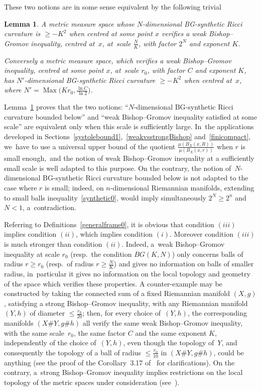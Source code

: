 \documentclass[10pt,a4paper]{amsart}
\numberwithin{equation}{section}
\newtheorem{Lemma}[theor]{Lemma}
\newcommand{\Max}{\operatorname{Max}}
\begin{document}
These two notions are in some sense equivalent by the following trivial

\begin{Lemma}\label{Bishopvssynthetic}
A metric measure space whose $N$-dimensional BG-synthetic Ricci curvature
is $\ge -K^2$ when centred at some point $x$ verifies a weak Bishop--Gromov inequality,
centred at~$x$, at~scale $\frac{N}{K}$, with factor $2^{N}$ and exponent $K$.

Conversely a metric measure space, which verifies a weak Bishop--Gromov inequality, centred at some point $x$, at~scale $r_0$, with factor $C$ and
exponent $K$, has $N'$-dimensional BG-synthetic Ricci curvature $\ge -K^2$ when centred at~$x$, where
$N' = \Max \big( K r_0, \frac{\ln C}{\ln 2} \big)$.
\end{Lemma}

Lemma~\ref{Bishopvssynthetic} proves that the two notions: ``$N$-dimensional BG-synthetic Ricci curvature boun\-ded below'' and
``weak Bishop--Gromov inequality satisfied at some scale'' are equivalent only when this scale is sufficiently large. In~the applications
developed in Sections~\ref{systolebound1},~\ref{weakvsstrongBishop} and~\ref{finicompact}, we~have to use a universal upper bound of the quotient
$\frac{\mu ( B_X(x, R))}{\mu ( B_X(x,r))}$ when $r$ is small enough,~and the notion of weak Bishop--Gromov inequality at a
sufficiently small scale is well adapted to this purpose. On the contrary, the notion of~$N$-dimensional BG-synthetic Ricci curvature bounded below
is not adapted to the case where $r$ is small; indeed, on $n$-dimensional
Riemannian manifolds, extending to small balls inequality~\eqref{synthetic0},
would imply simultaneously $2^N \ge 2^n$ and $N < 1$, a~contradiction.

Referring to Definitions~\ref{generalframe0}, it is obvious that condition $(iii)$ implies condition $(ii)$, which implies condition $(i)$. Moreover condition $(iii)$ is much stronger than condition $(ii)$.
Indeed, a~weak Bishop--Gromov inequality at scale $r_0$ (resp.\ the condition
$BG (K, N)$) only concerns balls of radius $r \ge r_0$ (resp.\ of radius $r \ge \frac{N}{K}$) and gives no information on balls of
smaller radius, in~particular it gives no information on the local topology and geometry of the space which verifies these properties. A counter-example may
be constructed by taking the connected sum of a fixed Riemannian manifold
$(X,g)$, satisfying a strong Bishop--Gromov inequality, with any Riemannian manifold $(Y,h)$ of diameter $\le \frac{r_0}{20}$; then, for every choice of~$(Y,h)$, the corresponding manifolds
$(X\# Y, g\# h)$ all verify the same weak Bishop--Gromov inequality, with
the same scale~$r_0$, the same factor $C$ and the same exponent $K$, independently of the choice of~$(Y,h)$, even though the topology of~$Y$, and consequently the topology of a ball of radius $\le \frac{r_0}{10}$ in $(X\# Y, g\# h)$, could be anything (see the proof of the Corollary~3.17 of~\cite{BCGS} for clarifications).
On the contrary, a~strong Bishop--Gromov inequality implies restrictions on the local topology of the metric spaces under consideration
(see~\cite[Theorem~5.1]{CS4}).
\end{document}
